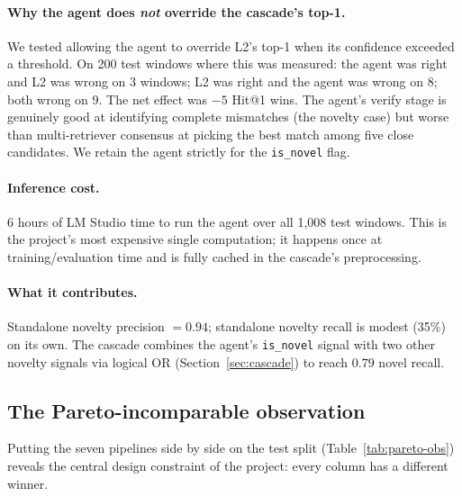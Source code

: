 \paragraph{Why the agent does \emph{not} override the cascade's top-1.} We tested allowing the agent to override L2's top-1 when its confidence exceeded a threshold. On 200 test windows where this was measured: the agent was right and L2 was wrong on 3 windows; L2 was right and the agent was wrong on 8; both wrong on 9. The net effect was $-5$ Hit@1 wins. The agent's verify stage is genuinely good at identifying complete mismatches (the novelty case) but worse than multi-retriever consensus at picking the best match among five close candidates. We retain the agent strictly for the \texttt{is\_novel} flag.

\paragraph{Inference cost.} 6 hours of LM Studio time to run the agent over all 1{,}008 test windows. This is the project's most expensive single computation; it happens once at training/evaluation time and is fully cached in the cascade's preprocessing.

\paragraph{What it contributes.} Standalone novelty precision $= 0.94$; standalone novelty recall is modest (35\%) on its own. The cascade combines the agent's \texttt{is\_novel} signal with two other novelty signals via logical OR (Section~\ref{sec:cascade}) to reach $0.79$ novel recall.

\subsection{The Pareto-incomparable observation}

Putting the seven pipelines side by side on the test split (Table~\ref{tab:pareto-obs}) reveals the central design constraint of the project: every column has a different winner.

